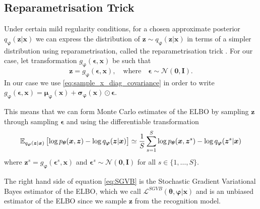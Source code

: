 \subsection{Reparametrisation Trick}
Under certain mild regularity conditions, for a chosen approximate posterior
$q_{\bm{\varphi}}(\bm{z} | \bm{x})$ we can express the distribution of $\bm{z}
\sim q_{\bm{\varphi}}(\bm{z} | \bm{x})$ in terms of a simpler distribution using
reparametrisation, called the reparametrisation trick
\cite{kingma_auto-encoding_2013}. For our case, let transformation
$g_{\bm{\varphi}}(\bm{\epsilon}, \bm{x})$ be such that
\begin{equation}
  \label{eq:reparametrisation_trick}
  \bm{z} = g_{\bm{\varphi}}(\bm{\epsilon}, \bm{x}), \quad \text{where} \quad \bm{\epsilon} \sim \mathcal{N}(\bm{0}, \bm{I}).
\end{equation}
In our case we use \eqref{eq:sample_x_diag_covariance} in order to write
$g_{\bm{\varphi}}(\bm{\epsilon}, \bm{x}) = \bm{\mu}_{\bm{\varphi}}(\bm{x}) +
\bm{\sigma}_{\bm{\varphi}}(\bm{x}) \odot \bm{\epsilon}$.

This means that we can form Monte Carlo estimates of the ELBO by sampling
$\bm{z}$ through sampling $\bm{\epsilon}$ and using the differentiable
transformation
\begin{equation}
  \label{eq:SGVB}
    \operatorname{\mathbb{E}}_{q_{\bm{\varphi}}(\bm{z} | \bm{x})} \left[ \log p_{\bm{\theta}}(\bm{x},  \bm{z}) - \log q_{\bm{\varphi}}(\bm{z} | \bm{x}) \right] \simeq \frac{1}{S} \sum_{s=1}^S \log p_{\bm{\theta}}(\bm{x},  \bm{z}^{s}) - \log q_{\bm{\varphi}}(\bm{z}^{s} | \bm{x})
\end{equation}
where $\bm{z}^{s} = g_{\bm{\varphi}}(\bm{\epsilon}^{s}, \bm{x})$ and
$\bm{\epsilon}^{s} \sim \mathcal{N}(\bm{0}, \bm{I})$ for all $s \in \{1, \dots, S\}$.

The right hand side of equation \eqref{eq:SGVB} is the Stochastic Gradient
Variational Bayes estimator of the ELBO, which we call
$\mathcal{L}^{SGVB}(\bm{\theta}, \bm{\varphi}| \bm{x})$ and is an unbiased
estimator of the ELBO since we sample $\bm{z}$ from the recognition model.

